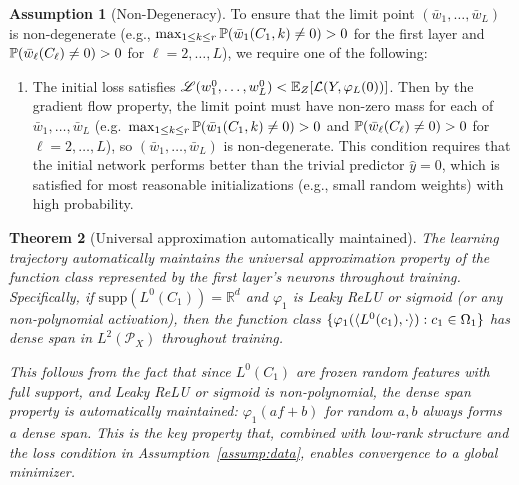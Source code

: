 \documentclass[nohyperref]{article}
\theoremstyle{plain}
\newtheorem{theorem}{Theorem}[section]
\theoremstyle{definition}
\newtheorem{assumption}[theorem]{Assumption}
\theoremstyle{remark}
\begin{document}
\begin{assumption}[Non-Degeneracy]
\label{assump:lr}
To ensure that the limit point $(\bar{w}_1,\ldots,\bar{w}_L)$ is non-degenerate (e.g., $\max_{1\le k\le r}\mathbb{P}(\bar{w}_1(C_1,k)\ne 0)>0$ for the first layer and $\mathbb{P}(\bar{w}_\ell(C_\ell)\ne 0)>0$ for $\ell=2,\ldots,L$), we require one of the following:
\begin{enumerate}
\item The initial loss satisfies $\mathscr{L}(w_1^0,\ldots,w_L^0) < \mathbb{E}_Z[\mathcal{L}(Y,\varphi_L(0))]$. Then by the gradient flow property, the limit point must have non-zero mass for each of $\bar{w}_1,\ldots,\bar{w}_L$ (e.g.\ $\max_{1\le k\le r}\mathbb{P}(\bar{w}_1(C_1,k)\ne 0)>0$ and $\mathbb{P}(\bar{w}_\ell(C_\ell)\ne 0)>0$ for $\ell=2,\ldots,L$), so $(\bar{w}_1,\ldots,\bar{w}_L)$ is non-degenerate. This condition requires that the initial network performs better than the trivial predictor $\hat y=0$, which is satisfied for most reasonable initializations (e.g., small random weights) with high probability.

\end{enumerate}
\end{assumption}

\begin{theorem}[Universal approximation automatically maintained]
\label{thm:uap-automatic}
The learning trajectory automatically maintains the universal approximation property of the function class represented by the first layer's neurons throughout training. Specifically, if $\text{supp}(L^0(C_1)) = \mathbb{R}^d$ and $\varphi_1$ is Leaky ReLU or sigmoid (or any non-polynomial activation), then the function class $\{\varphi_1(\langle L^0(c_1), \cdot \rangle): c_1\in\Omega_1\}$ has dense span in $L^2(\mathcal{P}_X)$ throughout training.

This follows from the fact that since $L^0(C_1)$ are frozen random features with full support, and Leaky ReLU or sigmoid is non-polynomial, the dense span property is automatically maintained: $\varphi_1(af+b)$ for random $a,b$ always forms a dense span. This is the key property that, combined with low-rank structure and the loss condition in Assumption~\ref{assump:data}, enables convergence to a global minimizer.
\end{theorem}
\end{document}
